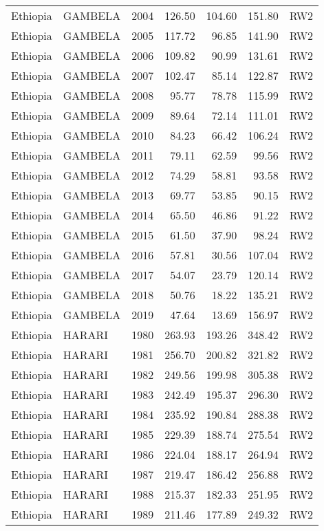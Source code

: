 \begin{longtable}{lllrrrl}
  Ethiopia & GAMBELA & 2004 & 126.50 & 104.60 & 151.80 & RW2 \\ 
  Ethiopia & GAMBELA & 2005 & 117.72 & 96.85 & 141.90 & RW2 \\ 
  Ethiopia & GAMBELA & 2006 & 109.82 & 90.99 & 131.61 & RW2 \\ 
  Ethiopia & GAMBELA & 2007 & 102.47 & 85.14 & 122.87 & RW2 \\ 
  Ethiopia & GAMBELA & 2008 & 95.77 & 78.78 & 115.99 & RW2 \\ 
  Ethiopia & GAMBELA & 2009 & 89.64 & 72.14 & 111.01 & RW2 \\ 
  Ethiopia & GAMBELA & 2010 & 84.23 & 66.42 & 106.24 & RW2 \\ 
  Ethiopia & GAMBELA & 2011 & 79.11 & 62.59 & 99.56 & RW2 \\ 
  Ethiopia & GAMBELA & 2012 & 74.29 & 58.81 & 93.58 & RW2 \\ 
  Ethiopia & GAMBELA & 2013 & 69.77 & 53.85 & 90.15 & RW2 \\ 
  Ethiopia & GAMBELA & 2014 & 65.50 & 46.86 & 91.22 & RW2 \\ 
  Ethiopia & GAMBELA & 2015 & 61.50 & 37.90 & 98.24 & RW2 \\ 
  Ethiopia & GAMBELA & 2016 & 57.81 & 30.56 & 107.04 & RW2 \\ 
  Ethiopia & GAMBELA & 2017 & 54.07 & 23.79 & 120.14 & RW2 \\ 
  Ethiopia & GAMBELA & 2018 & 50.76 & 18.22 & 135.21 & RW2 \\ 
  Ethiopia & GAMBELA & 2019 & 47.64 & 13.69 & 156.97 & RW2 \\ 
  Ethiopia & HARARI & 1980 & 263.93 & 193.26 & 348.42 & RW2 \\ 
  Ethiopia & HARARI & 1981 & 256.70 & 200.82 & 321.82 & RW2 \\ 
  Ethiopia & HARARI & 1982 & 249.56 & 199.98 & 305.38 & RW2 \\ 
  Ethiopia & HARARI & 1983 & 242.49 & 195.37 & 296.30 & RW2 \\ 
  Ethiopia & HARARI & 1984 & 235.92 & 190.84 & 288.38 & RW2 \\ 
  Ethiopia & HARARI & 1985 & 229.39 & 188.74 & 275.54 & RW2 \\ 
  Ethiopia & HARARI & 1986 & 224.04 & 188.17 & 264.94 & RW2 \\ 
  Ethiopia & HARARI & 1987 & 219.47 & 186.42 & 256.88 & RW2 \\ 
  Ethiopia & HARARI & 1988 & 215.37 & 182.33 & 251.95 & RW2 \\ 
  Ethiopia & HARARI & 1989 & 211.46 & 177.89 & 249.32 & RW2 \\ 

\end{longtable}
